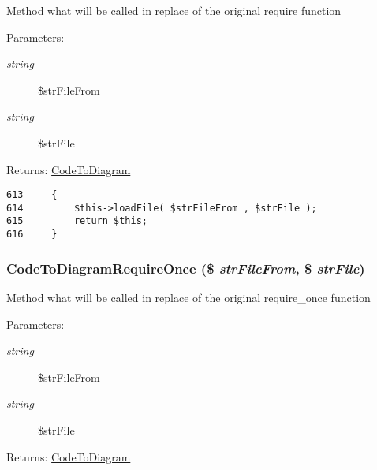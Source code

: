 Method what will be called in replace of the original require function

\begin{Desc}
\item[Parameters:]
\begin{description}
\item[{\em string}]\$strFileFrom \item[{\em string}]\$strFile \end{description}
\end{Desc}
\begin{Desc}
\item[Returns:]\hyperlink{class_code_to_diagram}{CodeToDiagram} \end{Desc}


\begin{Code}\begin{verbatim}613     {
614         $this->loadFile( $strFileFrom , $strFile );
615         return $this;
616     }
\end{verbatim}
\end{Code}


\hypertarget{class_code_to_diagram_f51b27f0764b66ac0d52a47399286180}{
\subsubsection[{CodeToDiagramRequireOnce}]{\setlength{\rightskip}{0pt plus 5cm}CodeToDiagramRequireOnce (\$ {\em strFileFrom}, \/  \$ {\em strFile})}}
\label{class_code_to_diagram_f51b27f0764b66ac0d52a47399286180}


Method what will be called in replace of the original require\_\-once function

\begin{Desc}
\item[Parameters:]
\begin{description}
\item[{\em string}]\$strFileFrom \item[{\em string}]\$strFile \end{description}
\end{Desc}
\begin{Desc}
\item[Returns:]\hyperlink{class_code_to_diagram}{CodeToDiagram} \end{Desc}


